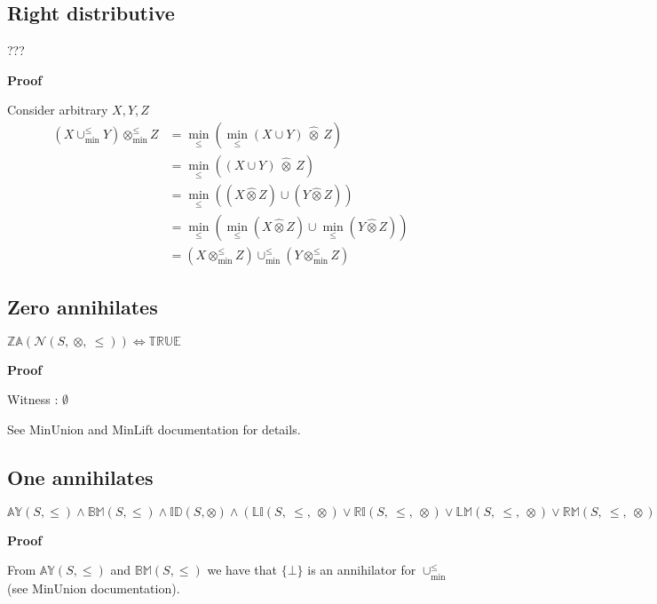 \documentclass[10pt]{article}
\newcommand{\propname}[1]{{\mathbb{#1}}}
\newcommand{\minlift}{\otimes_{\min}^{\leq}}
\newcommand{\lift}{\hat{\otimes}}
\newcommand{\minunion}{\cup_{\min}^{\leq}}
\newcommand{\proof}{\vspace{1em} \textbf{Proof} \vspace{1em}}
\begin{document}
\subsection{Right distributive}

???

\proof

Consider arbitrary $X,Y,Z$
\begin{align*}
(X \minunion Y) \minlift Z 	& = \min_\leq(\min_\leq(X \cup Y) \ \lift \ Z) \\
							& = \min_\leq((X \cup Y) \ \lift \ Z) \\
							& = \min_\leq((X \lift Z) \cup (Y \lift Z)) \\
							& = \min_\leq(\min_\leq(X \lift Z) \cup \min_\leq(Y \lift Z)) \\
							& = (X \minlift Z) \minunion (Y \minlift Z)
\end{align*}



\subsection{Zero annihilates}

$\propname{ZA}(\mathcal{N}(S,\ \otimes,\ \leq)) \Leftrightarrow \propname{TRUE}$

\proof

Witness : $\emptyset$

\vspace{0.5em}

See MinUnion and MinLift documentation for details.



\subsection{One annihilates}

$\propname{AY}(S,\leq) \wedge \propname{BM}(S,\leq) \wedge \propname{ID}(S,\otimes) \wedge (\propname{LI}(S,\ \leq,\ \otimes) \vee \propname{RI}(S,\ \leq,\ \otimes) \vee \propname{LM}(S,\ \leq,\ \otimes) \vee \propname{RM}(S,\ \leq,\ \otimes)) \Rightarrow (\propname{OA}(\mathcal{N}(S,\ \otimes,\ \leq)) \Leftrightarrow \propname{TRUE})$

\proof

From $\propname{AY}(S,\leq)$ and $\propname{BM}(S,\leq)$ we have that $\{ \bot \}$ is an annihilator for $\minunion$ (see MinUnion documentation).

\vspace{0.5em}
\end{document}
